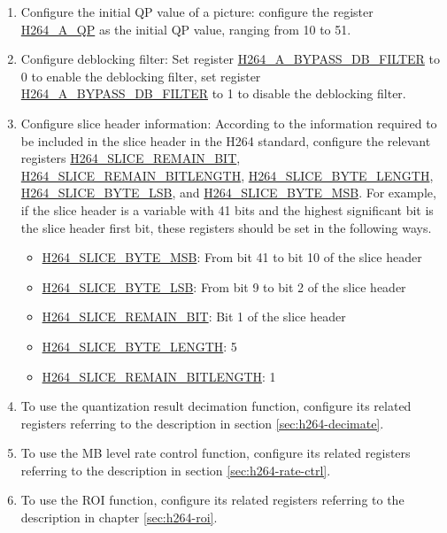 \documentclass[main\_\_EN.tex]{subfiles}
\begin{document}
\begin{enumerate}
\begin{enumerate}
        \item Configure the initial QP value of a picture: configure the register \hyperref[fielddesc:H264AQP]{H264\_A\_QP} as the initial QP value, ranging from 10 to 51.
        \item Configure deblocking filter: Set register \hyperref[fielddesc:H264ABYPASSDBFILTER]{H264\_A\_BYPASS\_DB\_FILTER} to 0 to enable the deblocking filter, set register \hyperref[fielddesc:H264ABYPASSDBFILTER]{H264\_A\_BYPASS\_DB\_FILTER} to 1 to disable the deblocking filter.
        \item Configure slice header information: According to the information required to be included in the slice header in the H264 standard, configure the relevant registers \hyperref[fielddesc:H264SLICEREMAINBIT]{H264\_SLICE\_REMAIN\_BIT}, \hyperref[fielddesc:H264SLICEREMAINBITLENGTH]{H264\_SLICE\_REMAIN\_BITLENGTH}, \hyperref[fielddesc:H264SLICEBYTELENGTH]{H264\_SLICE\_BYTE\_LENGTH}, \hyperref[fielddesc:H264SLICEBYTELSB]{H264\_SLICE\_BYTE\_LSB}, and \hyperref[fielddesc:H264SLICEBYTEMSB]{H264\_SLICE\_BYTE\_MSB}. For example, if the slice header is a variable with 41 bits and the highest significant bit is the slice header first bit, these registers should be set in the following ways.
            \begin{itemize}
                \item \hyperref[fielddesc:H264SLICEBYTEMSB]{H264\_SLICE\_BYTE\_MSB}: From bit 41 to bit 10 of the slice header
                \item \hyperref[fielddesc:H264SLICEBYTELSB]{H264\_SLICE\_BYTE\_LSB}: From bit 9 to bit 2 of the slice header
                \item \hyperref[fielddesc:H264SLICEREMAINBIT]{H264\_SLICE\_REMAIN\_BIT}: Bit 1 of the slice header
                \item \hyperref[fielddesc:H264SLICEBYTELENGTH]{H264\_SLICE\_BYTE\_LENGTH}: 5
                \item \hyperref[fielddesc:H264SLICEREMAINBITLENGTH]{H264\_SLICE\_REMAIN\_BITLENGTH}: 1
            \end{itemize}
        \item To use the quantization result decimation function, configure its related registers referring to the description in section \ref{sec:h264-decimate}.
        \item To use the MB level rate control function, configure its related registers referring to the description in section \ref{sec:h264-rate-ctrl}.
        \item To use the ROI function, configure its related registers referring to the description in chapter \ref{sec:h264-roi}.

\end{enumerate}
\end{enumerate}
\end{document}
